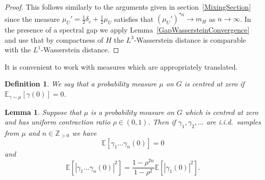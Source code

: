 \documentclass[10pt, english,oneside,reqno]{amsart}
\theoremstyle{plain}
\newtheorem{definition}[theorem]{Definition}
\newtheorem{lemma}[theorem]{Lemma}
\theoremstyle{remark}
\numberwithin{equation}{section}
\numberwithin{figure}{section}
\newcommand{\Z}{\mathbb{Z}}
\newcommand{\Haarof}[1]{m_{#1}}
\begin{document}

\begin{proof}
    This follows similarly to the arguments given in section~\ref{MixingSection} since the measure $\mu_U' = \frac{1}{2}\delta_e + \frac{1}{2}\mu_U$ satisfies that $(\mu_U')^{*n}\to \Haarof{H}$ as $n\to \infty$. In the presence of a spectral gap we apply Lemma~\ref{GapWassersteinConvergence} and use that by compactness of $H$ the $L^3$-Wasserstein distance is comparable with the $L^1$-Wasserstein distance.  
\end{proof}

It is convenient to work with measures which are appropriately translated.

\begin{definition}
	We say that a probability measure $\mu$ on $G$ is \emph{centred at zero} if $\mathbb{E}_{\gamma \sim \mu} [\gamma(0)] = 0$.
\end{definition}

\begin{lemma} \label{lemma:centred_variance}
	Suppose that $\mu$ is a probability measure on $G$ which is centred at zero and has uniform contraction ratio $\rho \in (0, 1)$. Then if $\gamma_1, \gamma_2, \dots$ are i.i.d.\ samples from $\mu$ and $n \in \mathbb{Z}_{>0}$ we have
	\begin{equation*}
		\mathbb{E}[\gamma_1 \dots \gamma_n(0)] = 0
	\end{equation*}
	and
	\begin{equation*}
		\mathbb{E} [|\gamma_1 \dots \gamma_n(0)|^2] = \frac{1 - \rho^{2n}}{1 - \rho^2} \mathbb{E} [|\gamma_1(0)|^2].
	\end{equation*}
\end{lemma}
\end{document}
